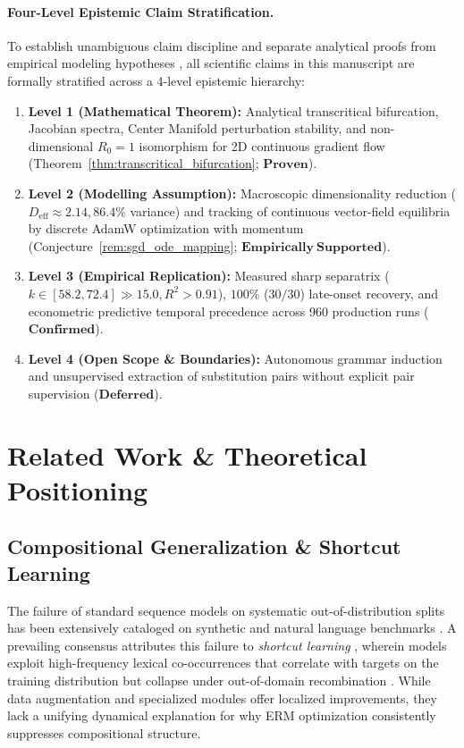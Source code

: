 \documentclass{article}
\theoremstyle{plain}
\theoremstyle{definition}
\begin{document}
\paragraph{Four-Level Epistemic Claim Stratification.}
To establish unambiguous claim discipline and separate analytical proofs from empirical modeling hypotheses \citep{Basri2026CompositionalPreprint}, all scientific claims in this manuscript are formally stratified across a 4-level epistemic hierarchy:
\begin{enumerate}[leftmargin=*,noitemsep]
    \item \textbf{Level 1 (Mathematical Theorem):} Analytical transcritical bifurcation, Jacobian spectra, Center Manifold perturbation stability, and non-dimensional $R_0 = 1$ isomorphism for 2D continuous gradient flow (Theorem~\ref{thm:transcritical_bifurcation}; $\mathbf{Proven}$).
    \item \textbf{Level 2 (Modelling Assumption):} Macroscopic dimensionality reduction ($D_{\text{eff}} \approx 2.14, 86.4\%$ variance) and tracking of continuous vector-field equilibria by discrete AdamW optimization with momentum (Conjecture~\ref{rem:sgd_ode_mapping}; $\mathbf{Empirically\ Supported}$).
    \item \textbf{Level 3 (Empirical Replication):} Measured sharp separatrix ($k \in [58.2, 72.4] \gg 15.0, R^2 > 0.91$), $100\%$ ($30/30$) late-onset recovery, and econometric predictive temporal precedence across 960 production runs ($\mathbf{Confirmed}$).
    \item \textbf{Level 4 (Open Scope \& Boundaries):} Autonomous grammar induction and unsupervised extraction of substitution pairs without explicit pair supervision ($\mathbf{Deferred}$).
\end{enumerate}

\section{Related Work \& Theoretical Positioning}
\label{sec:related_work}

\subsection{Compositional Generalization \& Shortcut Learning}
The failure of standard sequence models on systematic out-of-distribution splits has been extensively cataloged on synthetic and natural language benchmarks \citep{Lake2018Generalization,Kim2020COGS,Hupkes2019Compositionality,Keysers2019Measuring,Ruis2020Benchmark,Li2023SLOG}. A prevailing consensus attributes this failure to \emph{shortcut learning} \citep{Geirhos2020Shortcut}, wherein models exploit high-frequency lexical co-occurrences that correlate with targets on the training distribution but collapse under out-of-domain recombination \citep{Kim2022Uncontrolled,Wu2023ReCOGS,Jabbar2025Distinguishing}. While data augmentation \citep{Furrer2020Compositional} and specialized modules \citep{Drozdov2022Compositional,Kohli2026Loop} offer localized improvements, they lack a unifying dynamical explanation for why ERM optimization consistently suppresses compositional structure.
\end{document}
